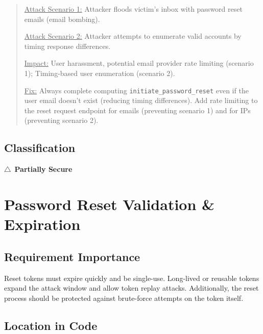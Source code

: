 \documentclass[11pt,a4paper]{article}
\newcommand{\partiallysecure}{\textcolor{warningorange}{$\triangle$~\textbf{Partially Secure}}}
\begin{document}
\begin{quote}
\underline{Attack Scenario 1:} Attacker floods victim's inbox with password reset emails (email bombing).

\underline{Attack Scenario 2:} Attacker attempts to enumerate valid accounts by timing response differences.

\underline{Impact:} User harassment, potential email provider rate limiting (scenario 1); Timing-based user enumeration (scenario 2).

\underline{Fix:} Always complete computing \texttt{initiate\_password\_reset} even if the user email doesn't exist (reducing timing differences). Add rate limiting to the reset request endpoint for emails (preventing scenario 1) and for IPs (preventing scenario 2).
\end{quote}

\subsection{Classification}
\partiallysecure

\newpage
\section{Password Reset Validation \& Expiration}

\subsection{Requirement Importance}
Reset tokens must expire quickly and be single-use. Long-lived or reusable tokens expand the attack window and allow token replay attacks. Additionally, the reset process should be protected against brute-force attempts on the token itself.

\subsection{Location in Code}
\end{document}
